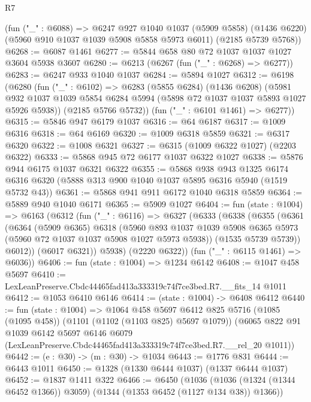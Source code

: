 \begin{lexlean}{R7}
\begin{coremodule}
    (fun ("_" : @6088) =>
    @6247
      @927
      @1040
      @1037
      (@5909 @5858)
      (@1436 @6220)
      (@5960 @910 @1037 @1039 @5908 @5858 @5973 @6011)
      (@2185 @5739 @5768))
@6268 := @6087 @1461
@6277 := @5844 @658 @80 @72 @1037 @1037 @1027 @3604 @5938 @3607
@6280 := @6213 (@6267 (fun ("_" : @6268) => @6277))
@6283 := @6247 @933 @1040 @1037
@6284 := @5894 @1027
@6312 := @6198
    (@6280
      (fun ("_" : @6102) =>
      @6283
        (@5855 @6284)
        (@1436 @6208)
        (@5981 @932 @1037 @1039 @5854 @6284 @5994 (@5898 @72 @1037 @1037 @5893 @1027 @5926 @5938))
        (@2185 @5766 @5732))
      (fun ("_" : @6101 @1461) => @6277))
@6315 := @5846 @947 @6179 @1037
@6316 := @64 @6187
@6317 := @1009 @6316
@6318 := @64 @6169
@6320 := @1009 @6318 @5859
@6321 := @6317 @6320
@6322 := @1008 @6321
@6327 := @6315 (@1009 @6322 @1027) (@2203 @6322)
@6333 := @5868 @945 @72 @6177 @1037 @6322 @1027
@6338 := @5876 @944 @6175 @1037 @6321 @6322
@6355 := @5868
    @938
    @943
    @1325
    @6174
    @6316
    @6320
    (@5888 @313 @900 @1040 @1037 @5895 @6316 @5940 (@1519 @5732 @43))
@6361 := @5868 @941 @911 @6172 @1040 @6318 @5859
@6364 := @5889 @940 @1040 @6171
@6365 := @5909 @1027
@6404 := fun (state : @1004) =>
  @6163
    (@6312
      (fun ("_" : @6116) =>
      @6327
        (@6333
          (@6338
            (@6355
              (@6361
                (@6364
                  (@5909 @6365)
                  @6318
                  (@5960
                    @893
                    @1037
                    @1039
                    @5908
                    @6365
                    @5973
                    (@5960 @72 @1037 @1037 @5908 @1027 @5973 @5938))
                  (@1535 @5739 @5739))
                @6012))
            (@6017 @6321))
          @5938)
        (@2220 @6322))
      (fun ("_" : @6115 @1461) => @6036))
@6406 := fun (state : @1004) => @1234 @6142
@6408 := @1047 @458 @5697
@6410 := LexLeanPreserve.Cbdc44465fad413a333319c74f7ce3bed.R7.__fits_14 @1011
@6412 := @1053 @6410 @6146
@6414 := (state : @1004) -> @6408 @6412
@6440 := fun (state : @1004) =>
  @1064
    @458
    @5697
    @6412
    @825
    @5716
    (@1085 (@1095 @458))
    (@1101 (@1102 (@1103 @825) @5697 @1079))
    (@6065
      @822
      @91
      @1039
      @6142
      @5697
      @6146
      @6079
      (LexLeanPreserve.Cbdc44465fad413a333319c74f7ce3bed.R7.__rel_20 @1011))
@6442 := (e : @30) -> (m : @30) -> @1034
@6443 := @1776 @831
@6444 := @6443 @1011
@6450 := @1328 (@1330 @6444 @1037) (@1337 @6444 @1037)
@6452 := @1837 @1411 @322
@6466 := @6450
    (@1036 (@1036 (@1324 (@1344 @6452 @1366)) @3059) (@1344 (@1353 @6452 (@1127 @134 @38)) @1366))

\end{coremodule}
\end{lexlean}
